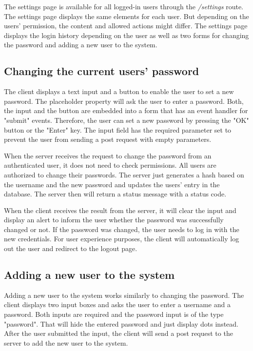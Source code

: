 The settings page is available for all logged-in users through the \textit{/settings} route. The settings page displays the same elements for each user. But depending on the users' permission, the content and allowed actions might differ. The settings page displays the login history depending on the user as well as two forms for changing the password and adding a new user to the system.



\subsection{Changing the current users' password}
\label{subsec:changing_the_current_users_password}

The client displays a text input and a button to enable the user to set a new password. The placeholder property will ask the user to enter a password. Both, the input and the button are embedded into a form that has an event handler for "submit" events. Therefore, the user can set a new password by pressing the "OK" button or the "Enter" key.  The input field has the required parameter set to prevent the user from sending a post request with empty parameters.

When the server receives the request to change the password from an authenticated user, it does not need to check permissions. All users are authorized to change their passwords. The server just generates a hash based on the username and the new password and updates the users' entry in the database. The server then will return a status message with a status code.

When the client receives the result from the server, it will clear the input and display an alert to inform the user whether the password was successfully changed or not. If the password was changed, the user needs to log in with the new credentials. For user experience purposes, the client will automatically log out the user and redirect to the logout page.



\subsection{Adding a new user to the system}
\label{subsec:adding_a_new_user_to_the_system}

Adding a new user to the system works similarly to changing the password. The client displays two input boxes and asks the user to enter a username and a password. Both inputs are required and the password input is of the type "password". That will hide the entered password and just display dots instead. After the user submitted the input, the client will send a post request to the server to add the new user to the system.

